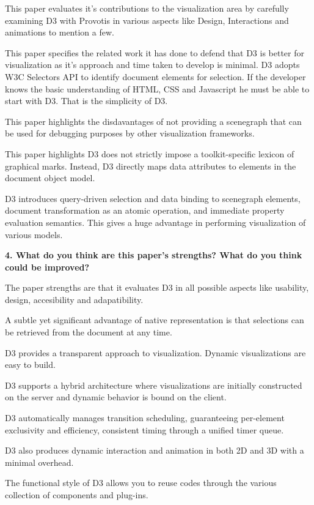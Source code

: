 \documentclass{article}[12pt]
\begin{document}
{
	This paper evaluates it's contributions to the visualization area by carefully examining D3 with Provotis in various aspects like Design, Interactions and animations to mention a few.

	This paper specifies the related work it has done to defend that D3 is better for visualization as it's approach and time taken to develop is minimal. D3 adopts W3C Selectors API to identify document elements for selection. If the developer knows the basic understanding of HTML, CSS and Javascript he must be able to start with D3. That is the simplicity of D3. 

	This paper highlights the disdavantages of not providing a scenegraph that can be used for debugging purposes by other visualization frameworks.

	This paper highlights D3 does not strictly impose a toolkit-specific lexicon of graphical marks. Instead, D3 directly maps data attributes to elements in the document object model.

	D3 introduces query-driven selection and data binding to scenegraph elements, document transformation as an atomic operation, and immediate property evaluation semantics. This gives a huge advantage in performing visualization of various models.

}




\vspace{2ex}\noindent
{ \bf 4. What do you think are this paper's strengths? What do you think could be
   improved? }

{
	The paper strengths are that it evaluates D3 in all possible aspects like usability, design, accesibility and adapatibility.

	A subtle yet significant advantage of native representation is that selections can be retrieved from the document at any time.

	D3 provides a transparent approach to visualization. Dynamic visualizations are easy to build.

	D3 supports a hybrid architecture where visualizations are initially constructed on the server and dynamic behavior is bound on the client.

	D3 automatically manages transition scheduling, guaranteeing per-element exclusivity and efficiency, consistent timing through a unified timer queue.

	D3 also produces dynamic interaction and animation in both 2D and 3D with a minimal overhead. 

	The functional style of D3 allows you to reuse codes through the various collection of components and plug-ins.

}
\end{document}
